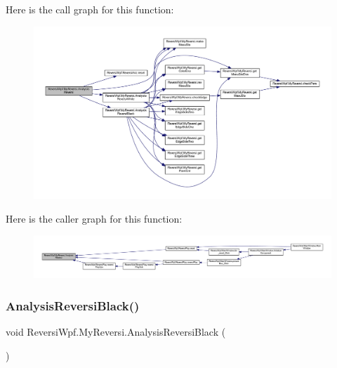 Here is the call graph for this function\+:
\nopagebreak
\begin{figure}[H]
\begin{center}
\leavevmode
\includegraphics[width=350pt]{class_reversi_wpf_1_1_my_reversi_a14a3c0720db3ff11196e0c7c34bd80c0_cgraph}
\end{center}
\end{figure}
Here is the caller graph for this function\+:
\nopagebreak
\begin{figure}[H]
\begin{center}
\leavevmode
\includegraphics[width=350pt]{class_reversi_wpf_1_1_my_reversi_a14a3c0720db3ff11196e0c7c34bd80c0_icgraph}
\end{center}
\end{figure}
\mbox{\label{class_reversi_wpf_1_1_my_reversi_af7ca68ea9f05d79c1debbdc320555098}} 
\subsubsection{\texorpdfstring{Analysis\+Reversi\+Black()}{AnalysisReversiBlack()}}
{\footnotesize\ttfamily void Reversi\+Wpf.\+My\+Reversi.\+Analysis\+Reversi\+Black (\begin{DoxyParamCaption}{ }\end{DoxyParamCaption})\hspace{0.3cm}{\ttfamily [private]}}



